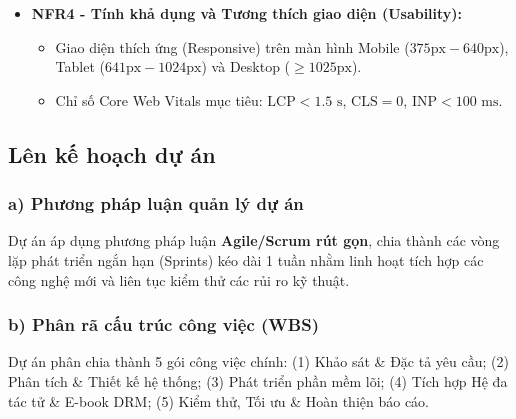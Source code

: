 \documentclass[11pt, a4paper]{report}
\begin{document}
\begin{itemize}
\begin{itemize}
        \item $100\%$ lưu lượng truy cập mạng thực thi qua giao thức bảo mật HTTPS / TLS 1.3.
        \item Mật khẩu được băm bằng thuật toán \texttt{bcrypt} với hệ số phức tạp $\text{Cost Factor} = 12$.
        \item Refresh Token lưu trữ trong Cookie với cờ \texttt{HttpOnly}, \texttt{Secure}, \texttt{SameSite=Strict}.
        \item Quá trình giải mã E-book diễn ra trong bộ nhớ tuyến tính cô lập của WebAssembly và xóa sạch bộ nhớ (Zero-out Memory) ngay sau khi vẽ lên Canvas.
        \item Mọi tương tác thay đổi trạng thái nhạy cảm (như hủy đơn hàng qua Voice AI) đều bắt buộc ghi vết vào bảng nhật ký kiểm toán \texttt{audit\_logs}.
    \end{itemize}
    \item \textbf{NFR4 - Tính khả dụng và Tương thích giao diện (Usability):}
    \begin{itemize}
        \item Giao diện thích ứng (Responsive) trên màn hình Mobile ($375\text{px} - 640\text{px}$), Tablet ($641\text{px} - 1024\text{px}$) và Desktop ($\ge 1025\text{px}$).
        \item Chỉ số Core Web Vitals mục tiêu: $\text{LCP} < 1.5\text{ s}$, $\text{CLS} = 0$, $\text{INP} < 100\text{ ms}$.
    \end{itemize}
\end{itemize}

\subsection{Lên kế hoạch dự án}

\subsubsection{a) Phương pháp luận quản lý dự án}
Dự án áp dụng phương pháp luận \textbf{Agile/Scrum rút gọn}, chia thành các vòng lặp phát triển ngắn hạn (Sprints) kéo dài 1 tuần nhằm linh hoạt tích hợp các công nghệ mới và liên tục kiểm thử các rủi ro kỹ thuật.

\subsubsection{b) Phân rã cấu trúc công việc (WBS)}
Dự án phân chia thành 5 gói công việc chính: (1) Khảo sát \& Đặc tả yêu cầu; (2) Phân tích \& Thiết kế hệ thống; (3) Phát triển phần mềm lõi; (4) Tích hợp Hệ đa tác tử \& E-book DRM; (5) Kiểm thử, Tối ưu \& Hoàn thiện báo cáo.
\end{document}
